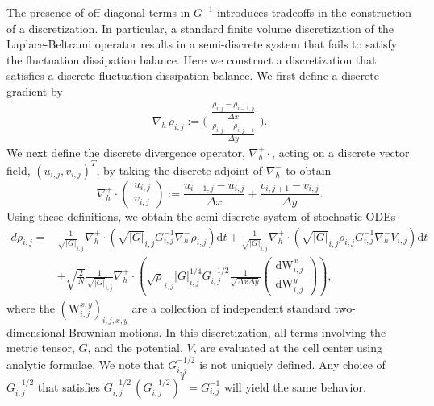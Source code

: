 \documentclass[11pt, a4paper]{article}
\newcommand{\mathd}{\mathrm{d}}
\begin{document}
The presence of off-diagonal terms in $G^{-1}$ introduces tradeoffs in the construction of a discretization.  In particular, a standard finite volume discretization of the Laplace-Beltrami operator results in a semi-discrete system that fails to satisfy the fluctuation dissipation balance.  Here we construct a discretization that satisfies a discrete fluctuation dissipation balance.
We first define a discrete gradient by
\[
\nabla_h^- \rho_{i,j} := \Biggl( 
\begin{matrix}
    \frac{\rho_{i,j}-\rho_{i-1,j}}{\Delta x} \\[.2cm]
    \frac{\rho_{i,j}-\rho_{i,j-1}}{\Delta y}
\end{matrix}\Biggr).
\]
We next define the discrete divergence operator, $\nabla_h^+ \cdot$, acting on a discrete vector field, $(u_{i,j},v_{i,j})^T$, by taking the discrete adjoint of $\nabla_h^-$ to obtain
\[
\nabla_h^+ \cdot
\begin{pmatrix}
u_{i,j} \\
v_{i,j} 
\end{pmatrix}
 := 
\frac{u_{i+1,j}-u_{i,j}}{\Delta x} + \frac{v_{i,j+1}-v_{i,j}}{\Delta y} .
\]
Using these definitions, we obtain the semi-discrete system of stochastic ODEs
\begin{eqnarray}
    d\rho_{i,j} =& \!\!\!\frac{1}{\sqrt{|G|}_{i,j}}\nabla_h^+ \cdot (\sqrt{|G|}_{i,j}G_{i,j}^{-1}\nabla_h^- \rho_{i,j})\mathd t + \frac{1}{\sqrt{|G|}_{i,j}}\nabla_h^+ \cdot ( \sqrt{|G|}_{i,j} \rho_{i,j} G_{i,j}^{-1}\nabla_h^- V_{i,j}) \mathd t \nonumber \\ &+ \sqrt{\frac{2}{N}} \frac{1}{\sqrt{|G|}_{i,j}} \nabla_h^+ \cdot \left(\sqrt{\rho}_{i,j} |G|_{i,j}^{1/4}G_{i,j}^{-1/2} \frac{1}{\sqrt{ \Delta x \Delta y}} \begin{pmatrix}
        \mathd\mathrm{W}_{i,j}^x \\[.1cm]
        \mathd\mathrm{W}_{i,j}^y
    \end{pmatrix}\right),
    \label{eq:fv_semidisc}
\end{eqnarray}
where the $(\mathrm{W}_{i,j}^{x,y})_{i,j,x,y}$ are a collection of independent standard two-dimensional Brownian motions.  In this discretization, all terms involving the metric tensor, $G$, and the potential, $V$, are evaluated at the cell center using analytic formulae.  We note that $G_{i,j}^{-1/2}$ is not uniquely defined.  Any choice of $G_{i,j}^{-1/2}$ that satisfies $G_{i,j}^{-1/2} \, (G_{i,j}^{-1/2})^T = G_{i,j}^{-1}$ will yield the same behavior.
\end{document}
